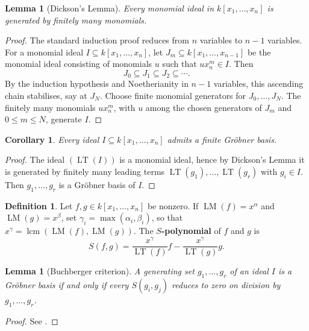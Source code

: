 \documentclass[12pt]{article}
\theoremstyle{plain}
\newtheorem{lemma}[thm]{Lemma}
\newtheorem{cor}[thm]{Corollary}
\theoremstyle{definition}
\newtheorem{defn}[thm]{Definition} %
\begin{document}
\begin{lemma}[Dickson's Lemma]\label{lem:Dickson}
Every monomial ideal in $k[x_1,\ldots,x_n]$ is generated by finitely many monomials.
\end{lemma}
\begin{proof}
The standard induction proof reduces from $n$ variables to $n-1$ variables. For a monomial ideal $I\subseteq k[x_1,\ldots,x_n]$, let $J_m\subseteq k[x_1,\ldots,x_{n-1}]$ be the monomial ideal consisting of monomials $u$ such that $ux_n^m\in I$. Then
\[
J_0\subseteq J_1\subseteq J_2\subseteq\cdots.
\]
By the induction hypothesis and Noetherianity in $n-1$ variables, this ascending chain stabilises, say at $J_N$. Choose finite monomial generators for $J_0,\ldots,J_N$. The finitely many monomials $ux_n^m$, with $u$ among the chosen generators of $J_m$ and $0\leq m\leq N$, generate $I$.
\end{proof}

\begin{cor}\label{cor:grobner_basis_existence}
Every ideal $I\subseteq k[x_1,\ldots,x_n]$ admits a finite Gr\"obner basis.
\end{cor}
\begin{proof}
The ideal $(\operatorname{LT}(I))$ is a monomial ideal, hence by Dickson's Lemma it is generated by finitely many leading terms $\operatorname{LT}(g_1),\ldots,\operatorname{LT}(g_r)$ with $g_i\in I$. Then $g_1,\ldots,g_r$ is a Gr\"obner basis of $I$.
\end{proof}

\begin{defn}
Let $f,g\in k[x_1,\ldots,x_n]$ be nonzero. If $\operatorname{LM}(f)=x^\alpha$ and $\operatorname{LM}(g)=x^\beta$, set $\gamma_i=\max(\alpha_i,\beta_i)$, so that $x^\gamma=\operatorname{lcm}(\operatorname{LM}(f),\operatorname{LM}(g))$. The \textbf{$S$-polynomial} of $f$ and $g$ is
\[
S(f,g)=\frac{x^\gamma}{\operatorname{LT}(f)}f-\frac{x^\gamma}{\operatorname{LT}(g)}g.
\]
\end{defn}

\begin{lemma}[Buchberger criterion]\label{lem:suffices_S_poly}
A generating set $g_1,\ldots,g_r$ of an ideal $I$ is a Gr\"obner basis if and only if every $S(g_i,g_j)$ reduces to zero on division by $g_1,\ldots,g_r$.
\end{lemma}
\begin{proof}
See \cite[\S 2.6, Theorem 6]{grobner}.
\end{proof}
\end{document}
